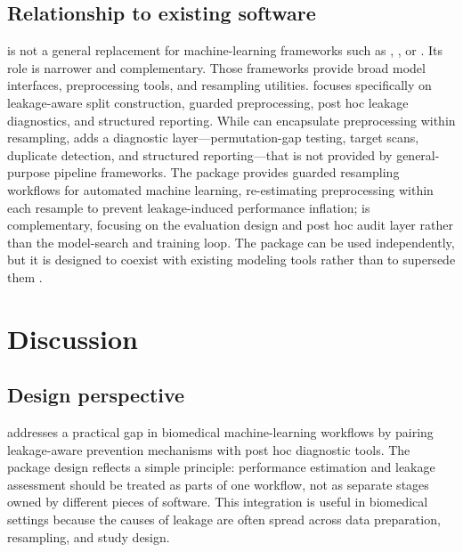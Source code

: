 \documentclass[article,shortnames]{jss}
\begin{document}
\subsection{Relationship to existing software}

 is not a general replacement for  machine-learning
frameworks such as , , or . Its
role is narrower and complementary. Those frameworks provide broad model
interfaces, preprocessing tools, and resampling utilities. 
focuses specifically on leakage-aware split construction, guarded preprocessing,
post hoc leakage diagnostics, and structured reporting. While  \citep{lang2019, bischl2024} can encapsulate preprocessing
within resampling,  adds a diagnostic layer---permutation-gap
testing, target scans, duplicate detection, and structured reporting---that
is not provided by general-purpose pipeline frameworks. The 
package \citep{korkmaz2026} provides guarded resampling workflows for
automated machine learning, re-estimating preprocessing within each resample
to prevent leakage-induced performance inflation;  is
complementary, focusing on the evaluation design and post hoc audit layer
rather than the model-search and training loop. The package can be used
independently, but it is designed to coexist with existing modeling tools
rather than to supersede them \citep{kuhn2008, kuhn2020, lang2019, bischl2024}.

\section{Discussion}\label{sec:discussion}

\subsection{Design perspective}

 addresses a practical gap in biomedical machine-learning
workflows by pairing leakage-aware prevention mechanisms with post hoc
diagnostic tools. The package design reflects a simple principle: performance
estimation and leakage assessment should be treated as parts of one workflow,
not as separate stages owned by different pieces of software. This integration
is useful in biomedical settings because the causes of leakage are often spread
across data preparation, resampling, and study design.
\end{document}

